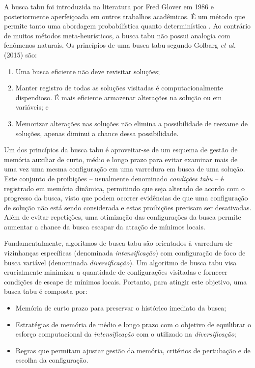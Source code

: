 A busca tabu foi introduzida na literatura por Fred Glover em 1986 \cite{GLOVER1986533} e posteriormente aperfeiçoada em outros trabalhos acadêmicos. É um método que permite tanto uma abordagem probabilística \cite{crainic1993dynamic} quanto determinística \cite{ongsakul2004unit}. Ao contrário de muitos métodos meta-heurísticos, a busca tabu não possui analogia com fenômenos naturais. Os princípios de uma busca tabu segundo Golbarg \emph{et al.} (2015) são:
\begin{enumerate}
    \item Uma busca eficiente não deve revisitar soluções;
    \item Manter registro de todas as soluções visitadas é computacionalmente dispendioso. É mais eficiente armazenar alterações na solução ou em variáveis; e
    \item Memorizar alterações nas soluções não elimina a possibilidade de reexame de soluções, apenas diminui a chance dessa possibilidade.
\end{enumerate}

Um dos princípios da busca tabu é aproveitar-se de um esquema de gestão de memória auxiliar de curto, médio e longo prazo para evitar examinar mais de uma vez uma mesma configuração em uma varredura em busca de uma solução. Este conjunto de proibições -- usualmente denominado \emph{condições tabu} -- é registrado em memória dinâmica, permitindo que seja alterado de acordo com o progresso da busca, visto que podem ocorrer evidências de que uma configuração de solução não está sendo considerada e estas proibições precisam ser desativadas. Além de evitar repetições, uma otimização das configurações da busca permite aumentar a chance da busca escapar da atração de mínimos locais. 

Fundamentalmente, algoritmos de busca tabu são orientados à varredura de vizinhanças específicas (denominada \emph{intensificação}) com configuração de foco de busca variável (denominada \emph{diversificação}). Um algoritmo de busca tabu visa crucialmente minimizar a quantidade de configurações visitadas e fornecer condições de escape de mínimos locais. Portanto, para atingir este objetivo, uma busca tabu é composta por:

\begin{itemize}
    \item Memória de curto prazo para preservar o histórico imediato da busca;
    \item Estratégias de memória de médio e longo prazo com o objetivo de equilibrar o esforço computacional da \emph{intensificação} com o utilizado na \emph{diversificação};
    \item Regras que permitam ajustar gestão da memória, critérios de pertubação e de escolha da configuração.
\end{itemize}

